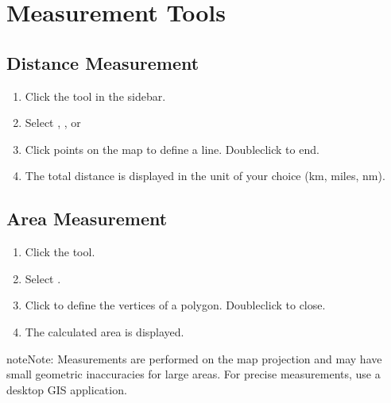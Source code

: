 \documentclass[letterpaper,10pt,english]{sphinxmanual}
\begin{document}
\section{Measurement Tools}
\label{\detokenize{04_exploring_maps:measurement-tools}}

\subsection{Distance Measurement}
\label{\detokenize{04_exploring_maps:distance-measurement}}\begin{enumerate}
%
\item {} 
\sphinxAtStartPar
Click the  tool in the sidebar.

\item {} 
\sphinxAtStartPar
Select , , or 

\item {} 
\sphinxAtStartPar
Click points on the map to define a line. Double\sphinxhyphen{}click to end.

\item {} 
\sphinxAtStartPar
The total distance is displayed in the unit of your choice (km, miles, nm).

\end{enumerate}


\subsection{Area Measurement}
\label{\detokenize{04_exploring_maps:area-measurement}}\begin{enumerate}
%
\item {} 
\sphinxAtStartPar
Click the  tool.

\item {} 
\sphinxAtStartPar
Select .

\item {} 
\sphinxAtStartPar
Click to define the vertices of a polygon. Double\sphinxhyphen{}click to close.

\item {} 
\sphinxAtStartPar
The calculated area is displayed.

\end{enumerate}

\begin{sphinxadmonition}{note}{Note:}
\sphinxAtStartPar
Measurements are performed on the map projection and may have small geometric
inaccuracies for large areas. For precise measurements, use a desktop GIS application.
\end{sphinxadmonition}
\end{document}
